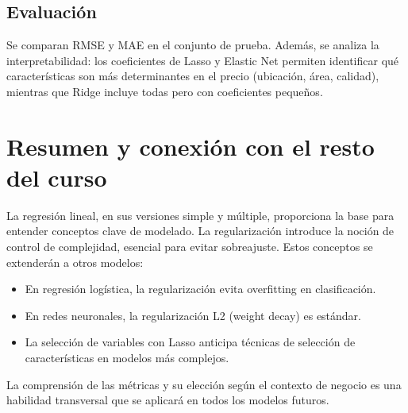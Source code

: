 \documentclass[12pt,a4paper,openany,oneside]{book}
\begin{document}
\subsection{Evaluación}
Se comparan RMSE y MAE en el conjunto de prueba. Además, se analiza la interpretabilidad: los coeficientes de Lasso y Elastic Net permiten identificar qué características son más determinantes en el precio (ubicación, área, calidad), mientras que Ridge incluye todas pero con coeficientes pequeños.

\section{Resumen y conexión con el resto del curso}
La regresión lineal, en sus versiones simple y múltiple, proporciona la base para entender conceptos clave de modelado. La regularización introduce la noción de control de complejidad, esencial para evitar sobreajuste. Estos conceptos se extenderán a otros modelos:
\begin{itemize}
    \item En regresión logística, la regularización evita overfitting en clasificación.
    \item En redes neuronales, la regularización L2 (weight decay) es estándar.
    \item La selección de variables con Lasso anticipa técnicas de selección de características en modelos más complejos.
\end{itemize}
La comprensión de las métricas y su elección según el contexto de negocio es una habilidad transversal que se aplicará en todos los modelos futuros.
\end{document}
